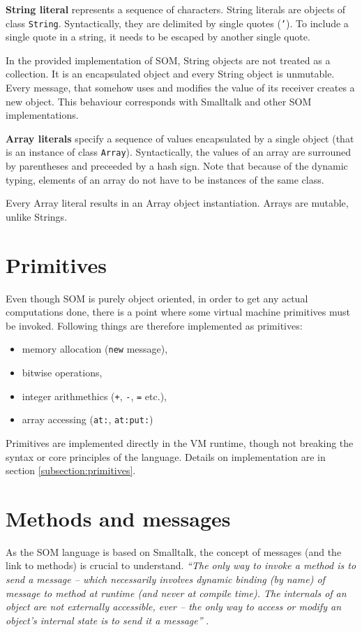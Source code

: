 \documentclass[thesis=M,english]{FITthesis}[2019/12/23]
\begin{document}
\textbf{String literal} represents a sequence of characters. String literals are objects of class \texttt{String}.
Syntactically, they are delimited by single quotes (\texttt{'}). To include a single quote in a string, it needs
to be escaped by another single quote.

In the provided implementation of SOM, String objects are not treated as a collection. It is an encapsulated object
and every String object is unmutable. Every message, that somehow uses and modifies the value of its receiver
creates a new object. This behaviour corresponds with Smalltalk and other SOM implementations.

\textbf{Array literals} specify a sequence of values encapsulated by a single object (that is an instance of class
\texttt{Array}). Syntactically, the values of an array are surrouned by parentheses and preceeded by a hash sign.
Note that because of the dynamic typing, elements of an array do not have to be instances of the same class.

Every Array literal results in an Array object instantiation. Arrays are mutable, unlike Strings.

\section{Primitives}
Even though SOM is purely object oriented, in order to get any actual computations done, there is a point where
some virtual machine primitives must be invoked. Following things are therefore implemented as primitives:
\begin{itemize}
	\item memory allocation (\texttt{new} message),
	\item bitwise operations,
	\item integer arithmethics (\texttt{+}, \texttt{-}, \texttt{=} etc.),
	\item array accessing (\texttt{at:}, \texttt{at:put:})
\end{itemize}

Primitives are implemented directly in the VM runtime, though not breaking the syntax or core principles of the
language. Details on implementation are in section \ref{subsection:primitives}.

\section{Methods and messages}
\label{section:messages}
As the SOM language is based on Smalltalk, the concept of messages (and the link to methods) is crucial to understand.
\textit{``The only way to invoke a method is to send a message -- which necessarily involves dynamic binding
(by name) of message to method at runtime (and never at compile time). The internals of an object are not
externally accessible, ever -- the only way to access or modify an object's internal state is to send it
a message''} \cite{smalltalk-essentials}.
\end{document}
